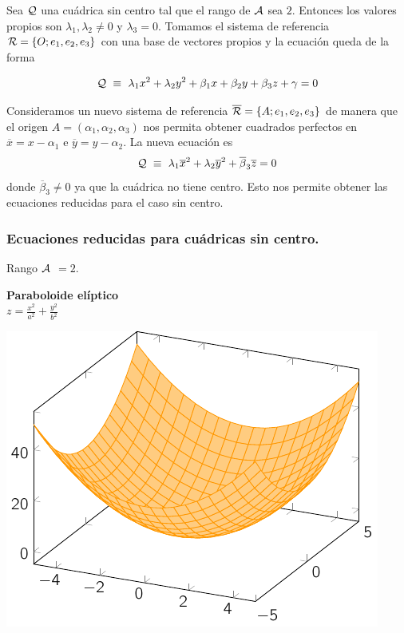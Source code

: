 Sea $\cal Q$ una cu\'adrica sin centro tal que el rango de $\cal A$ sea $2$. Entonces los valores propios son
$\lambda_1,\lambda_2 \neq 0$ y $\lambda_3=0$. Tomamos el sistema de referencia ${\cal R} = \{O; e_1,e_2,e_3\}$ con una base de vectores propios y la ecuaci\'on queda de la forma

\vspace{.3cm}

\[
{\cal Q} \, \, \equiv \, \, \lambda_1 x^2 + \lambda_2 y^2 + \beta_1 x + \beta_2 y + \beta_3 z + \gamma = 0
\]

\vspace{.2cm}

Consideramos un nuevo sistema de referencia $\overline{{\cal R}} = \{A;e_1,e_2,e_3\}$ de manera que el origen
$A=(\alpha_1,\alpha_2,\alpha_3)$ nos permita obtener cuadrados perfectos en $\overline{x}=x-\alpha_1$ e
$\overline{y}=y-\alpha_2$. La nueva ecuaci\'on es
\[
{\cal Q} \, \, \equiv \, \, \lambda_1 \overline{x}^2 + \lambda_2 \overline{y}^2 +
\overline{\beta}_3 \overline{z} = 0
\]
donde $\overline{\beta}_3\neq 0$ ya que la cu\'adrica no tiene centro. Esto nos permite obtener las ecuaciones reducidas para el caso sin centro.


\subsubsection{Ecuaciones reducidas para cuádricas sin centro.}

Rango $\cal A$ $=2$.

\begin{minipage}[c]{0.45\textwidth}
  {\bf Paraboloide elíptico}\vspace{1em}\\
  $\displaystyle z = \frac{x^2}{a^2} + \frac{y^2}{b^2}$
\end{minipage}\hfill
\begin{minipage}[]{0.45\textwidth}
\includegraphics{./img/peli.pdf}
\end{minipage}

